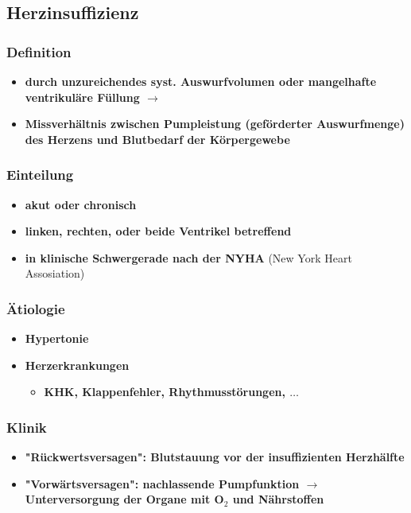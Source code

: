\subsection{Herzinsuffizienz}
	\subsubsection{Definition}
		\begin{itemize}
			\item \textbf{durch unzureichendes syst. Auswurfvolumen oder mangelhafte ventrikuläre Füllung $\rightarrow$}
			\item \textbf{Missverhältnis zwischen Pumpleistung (geförderter Auswurfmenge) des Herzens und Blutbedarf der Körpergewebe}
		\end{itemize}
	\subsubsection{Einteilung}
		\begin{itemize}
			\item \textbf{akut oder chronisch}
			\item \textbf{linken, rechten, oder beide Ventrikel betreffend}
			\item \textbf{in klinische Schwergerade nach der NYHA} (New York Heart Assosiation)
		\end{itemize}
	\subsubsection{Ätiologie}
		\begin{itemize}
			\item \textbf{Hypertonie}
			\item \textbf{Herzerkrankungen}
				\begin{itemize}
					\item \textbf{KHK, Klappenfehler, Rhythmusstörungen, $\dots$}
				\end{itemize}
		\end{itemize}
	\subsubsection{Klinik}
		\begin{itemize}
			\item \textbf{"Rückwertsversagen": Blutstauung vor der insuffizienten Herzhälfte}
			\item \textbf{"Vorwärtsversagen": nachlassende Pumpfunktion $\rightarrow$ Unterversorgung der Organe mit O$_2$ und Nährstoffen}
		\end{itemize}
